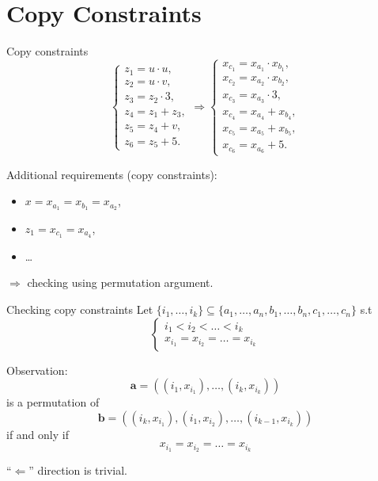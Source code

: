 \documentclass{beamer}
\begin{document}
	\section{Copy Constraints}
	\begin{frame}{Copy constraints}
		\begin{equation*}
			\begin{cases}
				z_1 = u \cdot u,\\
				z_2 = u \cdot v,\\
				z_3 = z_2 \cdot 3,\\
				z_4 = z_1 + z_3,\\
				z_5 = z_4 + v,\\
				z_6 = z_5 + 5.
			\end{cases}\Rightarrow
			\begin{cases}
				x_{c_1} = x_{a_1} \cdot x_{b_1},\\
				x_{c_2} = x_{a_2} \cdot x_{b_2},\\
				x_{c_3} = x_{a_3} \cdot 3,\\
				x_{c_4} = x_{a_4} + x_{b_4},\\
				x_{c_5} = x_{a_5} + x_{b_5},\\
				x_{c_6} = x_{a_6} + 5.
			\end{cases}
		\end{equation*}
	
		Additional requirements (copy constraints):
		\begin{itemize}
			\item $x = x_{a_1} = x_{b_1} = x_{a_2}$,\\
			\item $z_1 = x_{c_1} = x_{a_4}$,\\
			\item \dots
		\end{itemize}
		$\Rightarrow$ checking using permutation argument.
	\end{frame}
	\begin{frame}{Checking copy constraints}
		Let $\{i_1, \dots, i_k\} \subseteq \{a_1, \dots, a_n, b_1, \dots, b_n, c_1, \dots, c_n\}$ s.t 
		\begin{equation*}
			\begin{cases}
				i_1 < i_2 < \dots < i_k \\
				x_{i_1} = x_{i_2} = \dots = x_{i_k}
			\end{cases}
		\end{equation*}
		
		Observation: 
		\begin{equation*}
			\mathbf{a} = \left((i_1, x_{i_1}), \dots, (i_k, x_{i_k})\right) 
		\end{equation*}
		is a permutation of 
		\begin{equation*}
			\mathbf{b} = \left((i_k, x_{i_1}), (i_1, x_{i_2}), \dots, (i_{k - 1}, x_{i_k})\right) 
		\end{equation*}
		if and only if 
		\begin{equation*}
			x_{i_1} = x_{i_2} = \dots = x_{i_k}
		\end{equation*}
	
		``$\Leftarrow$'' direction is trivial.
	\end{frame}
\end{document}
